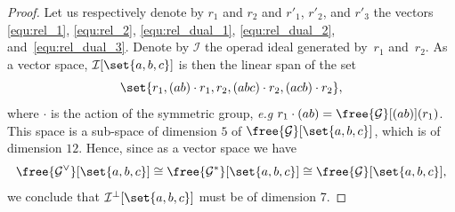 \begin{proof}
    Let us respectively denote by $r_1$ and $r_2$ and $r'_1$, $r'_2$, and $r'_3$ the vectors \eqref{equ:rel_1}, 
    \eqref{equ:rel_2}, \eqref{equ:rel_dual_1}, \eqref{equ:rel_dual_2}, and~\eqref{equ:rel_dual_3}. Denote by 
    $\mathcal{I}$ the operad ideal generated by~$r_1$ and~$r_2$. As a vector space, 
    $\mathcal{I}[\set{a,b,c}]$ is then the linear span of the set
    \begin{equation}
        \set{r_1, (ab)\cdot r_1, r_2, (abc) \cdot r_2, (acb) \cdot r_2},
    \end{equation}
    where $\cdot$ is the action of the symmetric group, \textit{e.g} 
    $r_1\cdot (ab) = \free{\mathcal{G}}[(ab)](r_1)$. This space is a sub-space of dimension $5$ of 
    $\free{\mathcal{G}}[\set{a,b,c}]$, which is of dimension $12$. Hence, since as a vector space we have
    \begin{equation}
        \free{\mathcal{G}^\vee}[\set{a,b,c}]
        \cong \free{\mathcal{G}^*}[\set{a,b,c}]\cong
        \free{\mathcal{G}}[\set{a,b,c}],
    \end{equation}
    we conclude that $\mathcal{I}^{\bot}[\set{a,b,c}]$ must be of dimension 7.


\end{proof}
